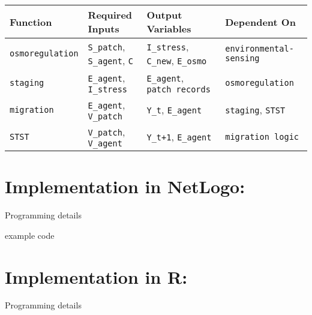 \documentclass[
]{book}
\begin{document}
\begin{longtable}[]{@{}
  >{\raggedright\arraybackslash}p{}
  >{\raggedright\arraybackslash}p{}
  >{\raggedright\arraybackslash}p{}
  >{\raggedright\arraybackslash}p{}@{}}
\toprule\noalign{}
\begin{minipage}[b]{\linewidth}\raggedright
Function
\end{minipage} & \begin{minipage}[b]{\linewidth}\raggedright
Required Inputs
\end{minipage} & \begin{minipage}[b]{\linewidth}\raggedright
Output Variables
\end{minipage} & \begin{minipage}[b]{\linewidth}\raggedright
Dependent On
\end{minipage} \\
\midrule\noalign{}
\endhead
\bottomrule\noalign{}
\endlastfoot
\texttt{osmoregulation} & \texttt{S\_patch}, \texttt{S\_agent}, \texttt{C} & \texttt{I\_stress}, \texttt{C\_new}, \texttt{E\_osmo} & \texttt{environmental-sensing} \\
\texttt{staging} & \texttt{E\_agent}, \texttt{I\_stress} & \texttt{E\_agent}, \texttt{patch\ records} & \texttt{osmoregulation} \\
\texttt{migration} & \texttt{E\_agent}, \texttt{V\_patch} & \texttt{Y\_t}, \texttt{E\_agent} & \texttt{staging}, \texttt{STST} \\
\texttt{STST} & \texttt{V\_patch}, \texttt{V\_agent} & \texttt{Y\_t+1}, \texttt{E\_agent} & \texttt{migration\ logic} \\
\end{longtable}

\section{Implementation in NetLogo:}\label{implementation-in-netlogo-1}

Programming details

example code

\section{Implementation in R:}\label{implementation-in-r-1}

Programming details
\end{document}

